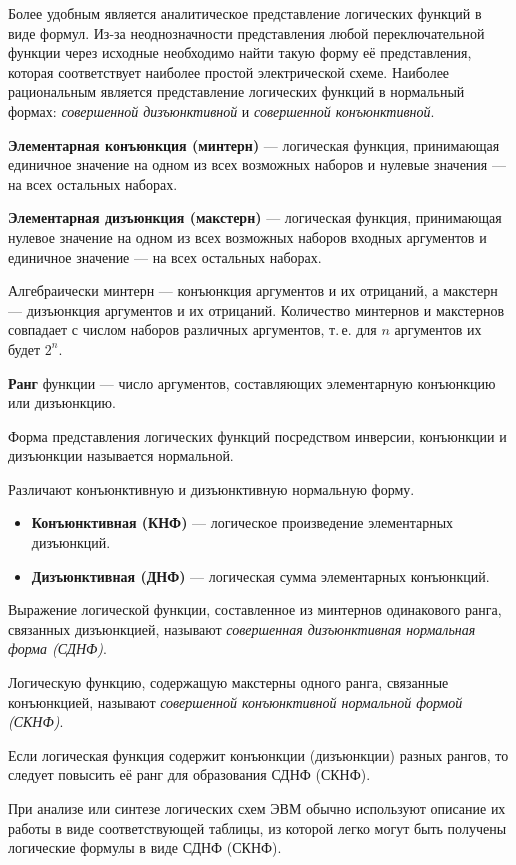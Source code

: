 \documentclass[10pt,a4paper,titlepage]{article}
\begin{document}
Более удобным является аналитическое представление логических функций в виде формул.
Из-за неоднозначности представления любой переключательной функции через исходные необходимо найти такую форму её представления, которая соответствует наиболее простой электрической схеме.
Наиболее рациональным является представление логических функций в нормальный формах: \textit{совершенной дизъюнктивной} и \textit{совершенной конъюнктивной}.

\textbf{Элементарная конъюнкция (минтерн)} --- логическая функция, принимающая единичное значение на одном из всех возможных наборов и нулевые значения --- на всех остальных наборах.

\textbf{Элементарная дизъюнкция (макстерн)} --- логическая функция, принимающая нулевое значение на одном из всех возможных наборов входных аргументов и единичное значение --- на всех остальных наборах.

Алгебраически минтерн --- конъюнкция аргументов и их отрицаний, а макстерн --- дизъюнкция аргументов и их отрицаний.
Количество минтернов и макстернов совпадает с числом наборов различных аргументов, т.\,е. для $n$ аргументов их будет $2^n$.

\textbf{Ранг} функции --- число аргументов, составляющих элементарную конъюнкцию или дизъюнкцию.

Форма представления логических функций посредством инверсии, конъюнкции и дизъюнкции называется нормальной.

Различают конъюнктивную и дизъюнктивную нормальную форму.

\begin{itemize}
\item \textbf{Конъюнктивная (КНФ)} --- логическое произведение элементарных дизъюнкций.
\item \textbf{Дизъюнктивная (ДНФ)} --- логическая сумма элементарных конъюнкций.
\end{itemize}

Выражение логической функции, составленное из минтернов одинакового ранга, связанных дизъюнкцией, называют \textit{совершенная дизъюнктивная нормальная форма (СДНФ)}.

Логическую функцию, содержащую макстерны одного ранга, связанные конъюнкцией, называют \textit{совершенной конъюнктивной нормальной формой (СКНФ)}.

Если логическая функция содержит конъюнкции (дизъюнкции) разных рангов, то следует повысить её ранг для образования СДНФ (СКНФ).

При анализе или синтезе логических схем ЭВМ обычно используют описание их работы в виде соответствующей таблицы, из которой легко могут быть получены логические формулы в виде СДНФ (СКНФ).
\end{document}
